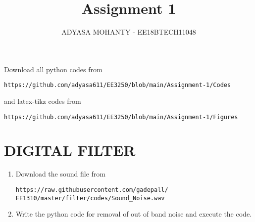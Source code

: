 \documentclass[journal,12pt,twocolumn]{IEEEtran}
\renewcommand\thesection{\arabic{section}}
\begin{document}
     \def\rightbox#1{\makebox[0in][r]{#1}}
     \def\centbox#1{\makebox[0in]{#1}}
     \def\topbox#1{\raisebox{-\baselineskip}[0in][0in]{#1}}
     \def\midbox#1{\raisebox{-0.5\baselineskip}[0in][0in]{#1}}
\vspace{3cm}
\title{Assignment 1}
\author{ADYASA MOHANTY - EE18BTECH11048}
\maketitle
\newpage
\bigskip
\renewcommand{\thefigure}{\theenumi}
\renewcommand{\thetable}{\theenumi}
Download all python codes from 
\begin{lstlisting}
https://github.com/adyasa611/EE3250/blob/main/Assignment-1/Codes
\end{lstlisting}
%
and latex-tikz codes from 
%
\begin{lstlisting}
https://github.com/adyasa611/EE3250/blob/main/Assignment-1/Figures
\end{lstlisting}
\section{DIGITAL FILTER}
\begin{enumerate}[label=\thesection.\arabic*
,ref=\thesection.\theenumi]
\item
\label{prob:input}
Download the sound file from  
\begin{lstlisting}
https://raw.githubusercontent.com/gadepall/ EE1310/master/filter/codes/Sound_Noise.wav
\end{lstlisting}

\item
\label{prob:output}
Write the python code for removal of out of band noise and execute the code.
\\
\solution

\end{enumerate}
\end{document}
